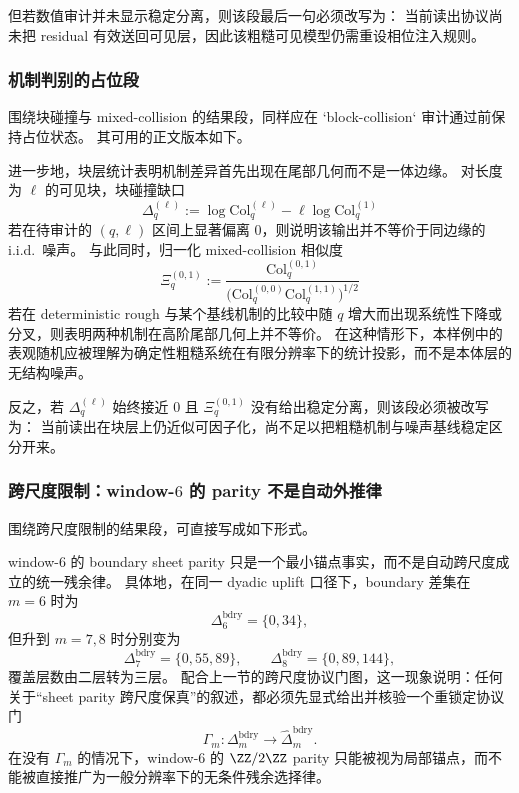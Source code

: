但若数值审计并未显示稳定分离，则该段最后一句必须改写为：
当前读出协议尚未把 residual 有效送回可见层，因此该粗糙可见模型仍需重设相位注入规则。

\subsubsection{机制判别的占位段}\label{subsubsec:typed-address-biaxial-completion-window6-results-mechanism-placeholder}
围绕块碰撞与 mixed-collision 的结果段，同样应在 `block-collision` 审计通过前保持占位状态。
其可用的正文版本如下。

进一步地，块层统计表明机制差异首先出现在尾部几何而不是一体边缘。
对长度为 \(\ell\) 的可见块，块碰撞缺口
\[
\Delta_q^{(\ell)}
:=
\log \mathrm{Col}_q^{(\ell)}-\ell\log \mathrm{Col}_q^{(1)}
\]
若在待审计的 \((q,\ell)\) 区间上显著偏离 \(0\)，则说明该输出并不等价于同边缘的 i.i.d.\ 噪声。
与此同时，归一化 mixed-collision 相似度
\[
\Xi_q^{(0,1)}
:=
\frac{\mathrm{Col}_q^{(0,1)}}
{\bigl(\mathrm{Col}_q^{(0,0)}\mathrm{Col}_q^{(1,1)}\bigr)^{1/2}}
\]
若在 deterministic rough 与某个基线机制的比较中随 \(q\) 增大而出现系统性下降或分叉，则表明两种机制在高阶尾部几何上并不等价。
在这种情形下，本样例中的表观随机应被理解为确定性粗糙系统在有限分辨率下的统计投影，而不是本体层的无结构噪声。

反之，若 \(\Delta_q^{(\ell)}\) 始终接近 \(0\) 且 \(\Xi_q^{(0,1)}\) 没有给出稳定分离，则该段必须被改写为：
当前读出在块层上仍近似可因子化，尚不足以把粗糙机制与噪声基线稳定区分开来。

\subsubsection{跨尺度限制：window-\texorpdfstring{$6$}{6} 的 parity 不是自动外推律}\label{subsubsec:typed-address-biaxial-completion-window6-results-crossscale-limit}
围绕跨尺度限制的结果段，可直接写成如下形式。

window-\(6\) 的 boundary sheet parity 只是一个最小锚点事实，而不是自动跨尺度成立的统一残余律。
具体地，在同一 dyadic uplift 口径下，boundary 差集在 \(m=6\) 时为
\[
\Delta_6^{\mathrm{bdry}}=\{0,34\},
\]
但升到 \(m=7,8\) 时分别变为
\[
\Delta_7^{\mathrm{bdry}}=\{0,55,89\},
\qquad
\Delta_8^{\mathrm{bdry}}=\{0,89,144\},
\]
覆盖层数由二层转为三层。
配合上一节的跨尺度协议门图，这一现象说明：任何关于“sheet parity 跨尺度保真”的叙述，都必须先显式给出并核验一个重锁定协议门
\[
\Gamma_m:\Delta_m^{\mathrm{bdry}}\to \widehat{\Delta}_m^{\mathrm{bdry}}.
\]
在没有 \(\Gamma_m\) 的情况下，window-\(6\) 的 \(\ZZ/2\ZZ\) parity 只能被视为局部锚点，而不能被直接推广为一般分辨率下的无条件残余选择律。

